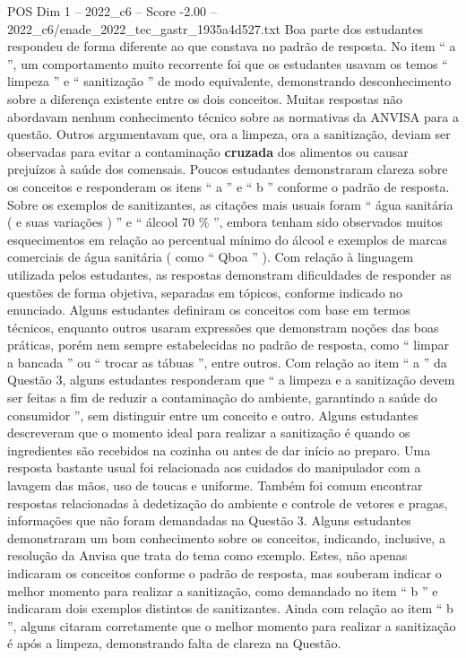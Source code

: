 \begin{textsample}{POS Dim 1 – 2022\_c6 – Score -2.00 – 2022\_c6/enade\_2022\_tec\_gastr\_1935a4d527.txt}
Boa parte dos estudantes respondeu de forma diferente ao que constava no padrão de resposta.
No item “ a ”, um comportamento muito recorrente foi que os estudantes usavam os temos “ limpeza ” e “ sanitização ” de modo equivalente, demonstrando desconhecimento sobre a diferença existente entre os dois conceitos.
Muitas respostas não abordavam nenhum conhecimento técnico sobre as normativas da ANVISA para a questão.
Outros argumentavam que, ora a limpeza, ora a sanitização, deviam ser observadas para evitar a contaminação \textbf{cruzada} dos alimentos ou causar prejuízos à saúde dos comensais.
Poucos estudantes demonstraram clareza sobre os conceitos e responderam os itens “ a ” e “ b ” conforme o padrão de resposta.
Sobre os exemplos de sanitizantes, as citações mais usuais foram “ água sanitária ( e suas variações ) ” e “ álcool 70 \% ”, embora tenham sido observados muitos esquecimentos em relação ao percentual mínimo do álcool e exemplos de marcas comerciais de água sanitária ( como “ Qboa ” ).
Com relação à linguagem utilizada pelos estudantes, as respostas demonstram dificuldades de responder as questões de forma objetiva, separadas em tópicos, conforme indicado no enunciado.
Alguns estudantes definiram os conceitos com base em termos técnicos, enquanto outros usaram expressões que demonstram noções das boas práticas, porém nem sempre estabelecidas no padrão de resposta, como “ limpar a bancada ” ou “ trocar as tábuas ”, entre outros.
Com relação ao item “ a ” da Questão 3, alguns estudantes responderam que “ a limpeza e a sanitização devem ser feitas a fim de reduzir a contaminação do ambiente, garantindo a saúde do consumidor ”, sem distinguir entre um conceito e outro.
Alguns estudantes descreveram que o momento ideal para realizar a sanitização é quando os ingredientes são recebidos na cozinha ou antes de dar início ao preparo.
Uma resposta bastante usual foi relacionada aos cuidados do manipulador com a lavagem das mãos, uso de toucas e uniforme.
Também foi comum encontrar respostas relacionadas à dedetização do ambiente e controle de vetores e pragas, informações que não foram demandadas na Questão 3.
Alguns estudantes demonstraram um bom conhecimento sobre os conceitos, indicando, inclusive, a resolução da Anvisa que trata do tema como exemplo.
Estes, não apenas indicaram os conceitos conforme o padrão de resposta, mas souberam indicar o melhor momento para realizar a sanitização, como demandado no item “ b ” e indicaram dois exemplos distintos de sanitizantes.
Ainda com relação ao item “ b ”, alguns citaram corretamente que o melhor momento para realizar a sanitização é após a limpeza, demonstrando falta de clareza na Questão.

\end{textsample}
